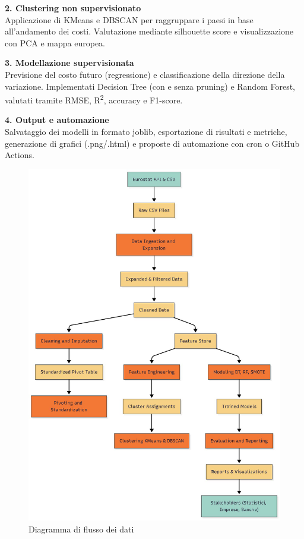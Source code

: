 \documentclass[conference]{IEEEtran}
\begin{document}
\vspace{1em}

{\large \textbf{2. Clustering non supervisionato}}\\
{\small Applicazione di KMeans e DBSCAN per raggruppare i paesi in base all’andamento dei costi. Valutazione mediante silhouette score e visualizzazione con PCA e mappa europea.}

\vspace{1em}

{\large \textbf{3. Modellazione supervisionata}}\\
{\small Previsione del costo futuro (regressione) e classificazione della direzione della variazione. Implementati Decision Tree (con e senza pruning) e Random Forest, valutati tramite RMSE, R\textsuperscript{2}, accuracy e F1-score.}

\vspace{1em}

{\large \textbf{4. Output e automazione}}\\
{\small Salvataggio dei modelli in formato joblib, esportazione di risultati e metriche, generazione di grafici (.png/.html) e proposte di automazione con cron o GitHub Actions.}



 
\begin{figure}[h]
  \centering
  \includegraphics[width=0.8\linewidth]{Data_Flow_Diagram.png}  
  \caption{Diagramma di flusso dei dati}
  \label{fig:dataflow}
\end{figure}
\end{document}

